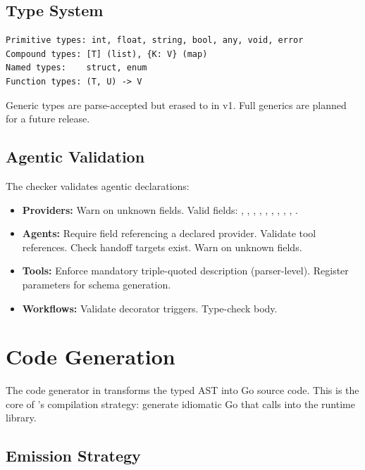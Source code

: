 \subsection{Type System}

\begin{lstlisting}[language={},numbers=none]
Primitive types: int, float, string, bool, any, void, error
Compound types: [T] (list), {K: V} (map)
Named types:    struct, enum
Function types: (T, U) -> V
\end{lstlisting}

\begin{note}
Generic types are parse-accepted but erased to  in v1. Full generics are planned for a future release.
\end{note}

\subsection{Agentic Validation}

The checker validates agentic declarations:

\begin{itemize}
    \item \textbf{Providers:} Warn on unknown fields. Valid fields: , , , , , , , , , .
    \item \textbf{Agents:} Require  field referencing a declared provider. Validate tool references. Check handoff targets exist. Warn on unknown fields.
    \item \textbf{Tools:} Enforce mandatory triple-quoted description (parser-level). Register parameters for schema generation.
    \item \textbf{Workflows:} Validate decorator triggers. Type-check body.
\end{itemize}

\section{Code Generation}

The code generator in  transforms the typed AST into Go source code. This is the core of \haira{}'s compilation strategy: generate idiomatic Go that calls into the \haira{} runtime library.

\subsection{Emission Strategy}


